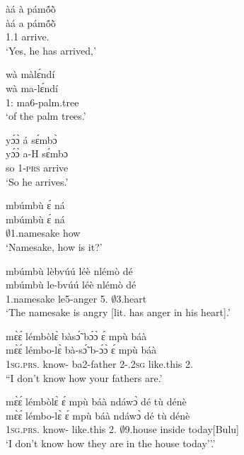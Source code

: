 \begin{exe}[(N234)]
\exN\label{n210}
  \glll àá à pámṍõ̀ \\
       àá a pámṍõ̀ \\
       {\EXCL} 1.{\PST}1 arrive.{\COMPL}  \\
    \trans `Yes, he has arrived,'
 
\exN\label{n211}
  \glll wà màlɛ́ndí\\
       wà ma-lɛ́ndí \\
         1:{\ATT}  ma6-palm.tree \\
    \trans `of the palm trees.'
 
\exN\label{n212}
  \glll yɔ́ɔ̀ á sɛ́mbɔ̀ \\
          yɔ́ɔ̀ a-H sɛ́mbɔ \\
         so 1-\textsc{prs} arrive \\
    \trans `So he arrives.'
 
\exN\label{n213}
  \glll mbúmbù ɛ́ ná \\
        mbúmbù ɛ́ ná \\
        $\emptyset$1.namesake {\LOC} how  \\
    \trans `Namesake, how is it?'
 
\exN\label{n214} 
  \glll mbúmbù lèbvúú léè nlémò dé \\
         mbúmbù le-bvúú léè nlémò dé \\
        {\N}1.namesake le5-anger 5.{\COP} $\emptyset$3.heart {\LOC}  \\
    \trans `The namesake is angry [lit. has anger in his heart].'
 
\exN\label{n215}
  \glll mɛ̀ɛ́ lémbòlɛ̀ bàsɔ̃́ bɔ́ɔ̀ ɛ́ mpù báà \\
       mɛ̀ɛ́ lémbo-lɛ̀ bà-sɔ̃́ b-ɔ́ɔ̀ ɛ́ mpù báà \\
       1\textsc{sg}.\textsc{prs}.{\NEG} know-{\NEG} ba2-father 2-{\POSS}.2\textsc{sg} {\LOC} like.this 2.{\COP} \\
    \trans ``I don't know how your fathers are.'
 
\exN\label{n216}
  \glll mɛ̀ɛ́ lémbòlɛ̀ ɛ́ mpù báà ndáwɔ̀ dé tù dénè\\
      mɛ̀ɛ́ lémbo-lɛ̀ ɛ́ mpù báà ndáwɔ̀ dé tù dénè\\
        1\textsc{sg}.\textsc{prs}.{\NEG} know-{\NEG} {\LOC} like.this 2.{\COP} $\emptyset$9.house {\LOC} inside today[Bulu]\\
    \trans `I don't know how they are in the house today''.'
\end{exe}

